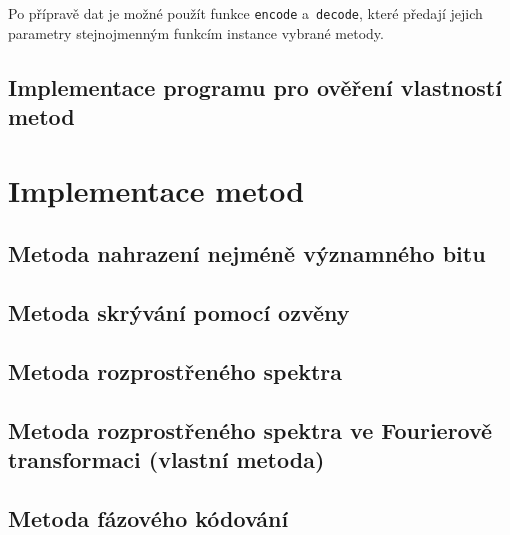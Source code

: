Po přípravě dat je možné použít funkce \texttt{encode} a~\texttt{decode}, které
předají jejich parametry stejnojmenným funkcím instance vybrané metody.

\subsection*{Implementace programu pro ověření vlastností metod}
\label{sub:tester-implementation}

\blindtext

\section{Implementace metod}
\label{sec:method-implementation}

\subsection*{Metoda nahrazení nejméně významného bitu}
\label{sub:lsb-implementation}

\blindtext

\subsection*{Metoda skrývání pomocí ozvěny}
\label{sub:echo-hiding-implementation}

\blindtext

\subsection*{Metoda rozprostřeného spektra}
\label{sub:dsss-implementation}

\blindtext

\subsection*{Metoda rozprostřeného spektra ve Fourierově transformaci (vlastní
metoda)}
\label{sub:dsssdft-implementation}

\blindtext

\subsection*{Metoda fázového kódování}
\label{sub:phase-coding-implementation}


\blindtext

